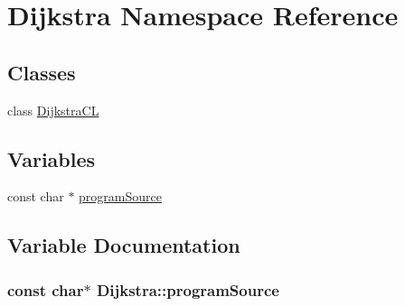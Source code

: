 \hypertarget{namespace_dijkstra}{\section{Dijkstra Namespace Reference}
\label{namespace_dijkstra}
}
\subsection*{Classes}
\begin{DoxyCompactItemize}
\item 
class \hyperlink{class_dijkstra_1_1_dijkstra_c_l}{Dijkstra\+C\+L}
\end{DoxyCompactItemize}
\subsection*{Variables}
\begin{DoxyCompactItemize}
\item 
const char $\ast$ \hyperlink{namespace_dijkstra_ae94cf55919875d2ef6d43e362e3b300b}{program\+Source}
\end{DoxyCompactItemize}


\subsection{Variable Documentation}
\hypertarget{namespace_dijkstra_ae94cf55919875d2ef6d43e362e3b300b}{
\subsubsection[{program\+Source}]{\setlength{\rightskip}{0pt plus 5cm}const char$\ast$ Dijkstra\+::program\+Source}}\label{namespace_dijkstra_ae94cf55919875d2ef6d43e362e3b300b}
